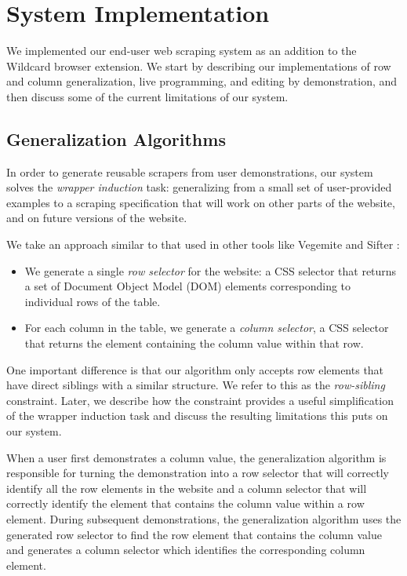 \documentclass[sigconf,10pt]{acmart}
\providecommand{\tightlist}{%
  \setlength{\itemsep}{0pt}\setlength{\parskip}{0pt}}
\begin{document}
\hypertarget{sec:implementation}{%
\section{System Implementation}\label{sec:implementation}}

We implemented our end-user web scraping system as an addition to the
Wildcard browser extension. We start by describing our implementations
of row and column generalization, live programming, and editing by
demonstration, and then discuss some of the current limitations of our
system.

\hypertarget{generalization-algorithms}{%
\subsection{Generalization Algorithms}\label{generalization-algorithms}}

In order to generate reusable scrapers from user demonstrations, our
system solves the \emph{wrapper induction} \citep{kushmerick2000} task:
generalizing from a small set of user-provided examples to a scraping
specification that will work on other parts of the website, and on
future versions of the website.

We take an approach similar to that used in other tools like Vegemite
\citep{lin2009} and Sifter \citep{huynh2006}:

\begin{itemize}
\tightlist
\item
  We generate a single \emph{row selector} for the website: a CSS
  selector that returns a set of Document Object Model (DOM) elements
  corresponding to individual rows of the table.
\item
  For each column in the table, we generate a \emph{column selector}, a
  CSS selector that returns the element containing the column value
  within that row.
\end{itemize}

One important difference is that our algorithm only accepts row elements
that have direct siblings with a similar structure. We refer to this as
the \emph{row-sibling} constraint. Later, we describe how the constraint
provides a useful simplification of the wrapper induction task and
discuss the resulting limitations this puts on our system.

When a user first demonstrates a column value, the generalization
algorithm is responsible for turning the demonstration into a row
selector that will correctly identify all the row elements in the
website and a column selector that will correctly identify the element
that contains the column value within a row element. During subsequent
demonstrations, the generalization algorithm uses the generated row
selector to find the row element that contains the column value and
generates a column selector which identifies the corresponding column
element.
\end{document}
